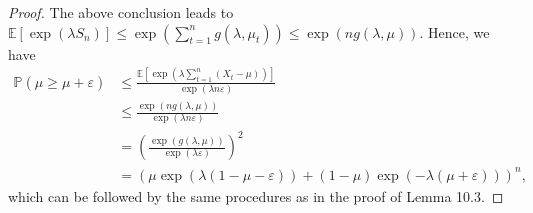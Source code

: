 \begin{proof}
    The above conclusion leads to $\mathbb{E}[\exp(\lambda S_{n})] \leq \exp(\sum_{t=1}^n g(\lambda, \mu_t)) \leq \exp(n g(\lambda, \mu))$.
    Hence, we have
    \begin{equation*}
        \begin{aligned}
            \mathbb{P}(\hat{\mu} \geq \mu+\varepsilon)
            &\leq \frac{\mathbb{E}[\exp(\lambda \sum_{t=1}^n (X_t - \mu))]}{\exp(\lambda n \varepsilon)}\\
            &\leq \frac{\exp(n g(\lambda, \mu))}{\exp(\lambda n \varepsilon)}\\
            &= (\frac{\exp(g(\lambda, \mu))}{\exp(\lambda \varepsilon)})^2\\
            &= (\mu \exp(\lambda(1 - \mu - \varepsilon)) + (1 - \mu) \exp(-\lambda(\mu + \varepsilon)))^n,
        \end{aligned}
    \end{equation*}
    which can be followed by the same procedures as in the proof of Lemma 10.3.
\end{proof}